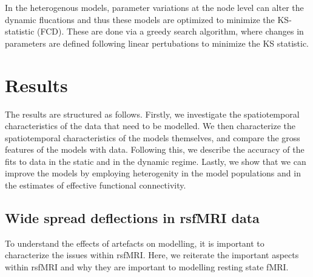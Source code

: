 \documentclass[oneside]{zHenriquesLab-StyleBioRxiv}
\begin{document}
In the heterogenous models, parameter variations at the node level can alter the dynamic flucations and thus these models are optimized to minimize the KS-statistic (FCD). These are done via a greedy search algorithm, where changes in parameters are defined following linear pertubations to minimize the KS statistic. 

\section*{Results}

The results are structured as follows. Firstly, we investigate the spatiotemporal characteristics of the data that need to be modelled. We then characterize the spatiotemporal characteristics of the models themselves, and compare the gross features of the models with data. Following this, we  describe the accuracy of the fits to data in the static and in the dynamic regime. Lastly, we show that we can improve the models by employing heterogenity in the model populations and in the estimates of effective functional connectivity. 

\subsection*{Wide spread deflections in rsfMRI data}
To understand the effects of artefacts on modelling, it is important to characterize the issues within rsfMRI. Here, we reiterate the important aspects within rsfMRI and why they are important to modelling resting state fMRI. 
\end{document}
